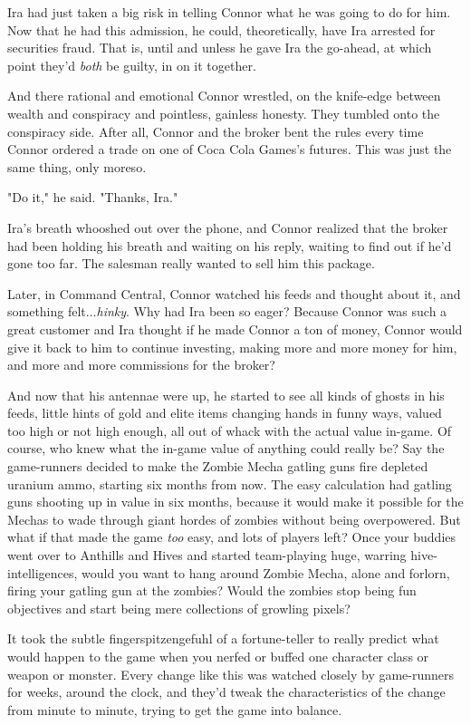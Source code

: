 Ira had just taken a big risk in telling Connor what he was going
to do for him. Now that he had this admission, he could,
theoretically, have Ira arrested for securities fraud. That is,
until and unless he gave Ira the go-ahead, at which point they'd
\emph{both} be guilty, in on it together.

And there rational and emotional Connor wrestled, on the knife-edge
between wealth and conspiracy and pointless, gainless honesty. They
tumbled onto the conspiracy side. After all, Connor and the broker
bent the rules every time Connor ordered a trade on one of Coca
Cola Games's futures. This was just the same thing, only moreso.

"Do it," he said. "Thanks, Ira."

Ira's breath whooshed out over the phone, and Connor realized that
the broker had been holding his breath and waiting on his reply,
waiting to find out if he'd gone too far. The salesman really
wanted to sell him this package.

Later, in Command Central, Connor watched his feeds and thought
about it, and something felt...\emph{hinky}. Why had Ira been so
eager? Because Connor was such a great customer and Ira thought if
he made Connor a ton of money, Connor would give it back to him to
continue investing, making more and more money for him, and more
and more commissions for the broker?

And now that his antennae were up, he started to see all kinds of
ghosts in his feeds, little hints of gold and elite items changing
hands in funny ways, valued too high or not high enough, all out of
whack with the actual value in-game. Of course, who knew what the
in-game value of anything could really be? Say the game-runners
decided to make the Zombie Mecha gatling guns fire depleted uranium
ammo, starting six months from now. The easy calculation had
gatling guns shooting up in value in six months, because it would
make it possible for the Mechas to wade through giant hordes of
zombies without being overpowered. But what if that made the game
\emph{too} easy, and lots of players left? Once your buddies went
over to Anthills and Hives and started team-playing huge, warring
hive-intelligences, would you want to hang around Zombie Mecha,
alone and forlorn, firing your gatling gun at the zombies? Would
the zombies stop being fun objectives and start being mere
collections of growling pixels?

It took the subtle fingerspitzengefuhl of a fortune-teller to
really predict what would happen to the game when you nerfed or
buffed one character class or weapon or monster. Every change like
this was watched closely by game-runners for weeks, around the
clock, and they'd tweak the characteristics of the change from
minute to minute, trying to get the game into balance.

